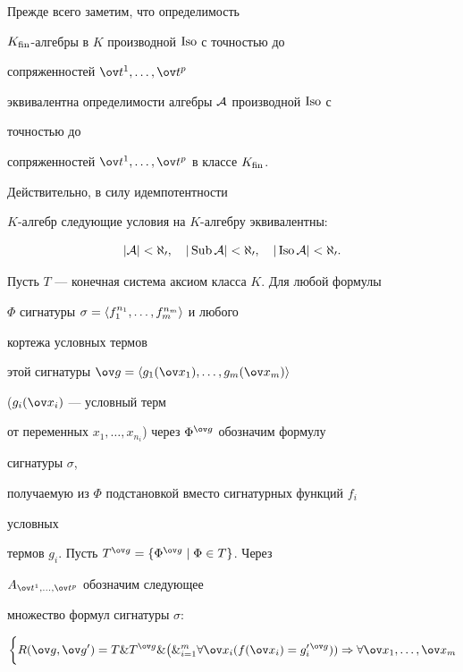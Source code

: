  


\begin{pf} 


Прежде всего заметим, что определимость 


$K_{\operatorname{fin}}$-алгебры в $K$ производной $\operatorname{Iso}$ с точностью до 


сопряженностей $\ov t^1,\dotsc,\ov t^p$ 


эквивалентна определимости алгебры $\cal A$ производной $\operatorname{Iso}$ с 


точностью до 


сопряженностей $\ov t^1,\dotsc,\ov t^p$ в классе $K_{\operatorname{fin}}$. 


Действительно, в силу идемпотентности 


$K$-алгебр следующие условия на $K$-алгебру эквивалентны: 


$$ 


|\cal A|<\aleph_0,\quad |\Sub\cal A|<\aleph_0,\quad 


|\Iso\cal A|<\aleph_0. 


$$ 


Пусть $T$ --- конечная система аксиом класса $K$. Для любой формулы 


$\Phi$ сигнатуры $\sigma=\langle f^{n_1}_1,\dotsc,f^{n_m}_m\rangle$ и любого 


кортежа условных термов 


этой сигнатуры $\ov g=\la g_1(\ov x_1),\dotsc,g_m(\ov x_m)\ra$ 


($g_i(\ov x_i)$ --- условный терм 


от переменных $x_1,\dotsc,x_{n_i}$) через $\Phi^{\ov g}$ обозначим формулу 


сигнатуры $\sigma$, 


получаемую из $\Phi$ подстановкой вместо сигнатурных функций $f_i$ 


условных 


термов $g_i$. Пусть $T^{\ov g}=\{\Phi^{\ov g}\mid\Phi\in T\}$. Через 


$A_{\ov t^1,\dotsc,\ov t^p}$ обозначим следующее 


множество формул сигнатуры $\sigma$: 


\begin{gather*} 


\bigg\{R(\ov g,\ov g')=T\& T^{\ov g}\&\big(\&^m_{i=1} 


\forall\ov x_i(f(\ov x_i)=g'_i{}^{\ov g}))\Rightarrow 


\forall \ov x_1,\dotsc,\ov x_m \\ 



\end{gather*}
\end{pf}
